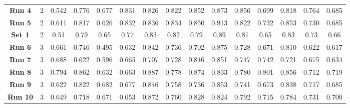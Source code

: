 \begin{table*}[!ht]
{\begin{tabular}{|c|c|ccc|ccc|ccc|c|c|c|c|}
			\textbf{Run 4} & 2 & \multicolumn{1}{c|}{0.542} & \multicolumn{1}{c|}{0.776} & 0.677 & \multicolumn{1}{c|}{0.831} & \multicolumn{1}{c|}{0.826} & 0.822 & \multicolumn{1}{c|}{0.852} & \multicolumn{1}{c|}{0.873} & 0.856 & 0.699 & 0.818 & 0.764 & 0.685 \\
			
			\textbf{Run 5} & 2 & \multicolumn{1}{c|}{0.611} & \multicolumn{1}{c|}{0.817} & 0.626 & \multicolumn{1}{c|}{0.832} & \multicolumn{1}{c|}{0.836} & 0.834 & \multicolumn{1}{c|}{0.850} & \multicolumn{1}{c|}{0.913} & 0.822 & 0.732 & 0.853 & 0.730 & 0.685 \\
			
			\hline
			
			\textbf{Set 1} & 2 & \multicolumn{1}{c|}{0.51} & \multicolumn{1}{c|}{0.79} & 0.65 & \multicolumn{1}{c|}{0.77} & \multicolumn{1}{c|}{0.83} & 0.82 & \multicolumn{1}{c|}{0.79} & \multicolumn{1}{c|}{0.89} & 0.81 & 0.65 & 0.83 & 0.73 & 0.66 \\
			
			\hline
			\hline
			
			\textbf{Run 6} & 3 & \multicolumn{1}{c|}{0.661} & \multicolumn{1}{c|}{0.746} & 0.495 & \multicolumn{1}{c|}{0.632} & \multicolumn{1}{c|}{0.842} & 0.736 & \multicolumn{1}{c|}{0.702} & \multicolumn{1}{c|}{0.875} & 0.728 & 0.671 & 0.810 & 0.622 & 0.617 \\
			
			\textbf{Run 7} & 3 & \multicolumn{1}{c|}{0.688} & \multicolumn{1}{c|}{0.622} & 0.596 & \multicolumn{1}{c|}{0.665} & \multicolumn{1}{c|}{0.707} & 0.728 & \multicolumn{1}{c|}{0.846} & \multicolumn{1}{c|}{0.851} & 0.747 & 0.742 & 0.721 & 0.675 & 0.634 \\
			
			\textbf{Run 8} & 3 & \multicolumn{1}{c|}{0.794} & \multicolumn{1}{c|}{0.862} & 0.632 & \multicolumn{1}{c|}{0.663} & \multicolumn{1}{c|}{0.887} & 0.778 & \multicolumn{1}{c|}{0.874} & \multicolumn{1}{c|}{0.833} & 0.780 & 0.801 & 0.856 & 0.712 & 0.719 \\
			
			\textbf{Run 9} & 3 & \multicolumn{1}{c|}{0.622} & \multicolumn{1}{c|}{0.822} & 0.682 & \multicolumn{1}{c|}{0.677} & \multicolumn{1}{c|}{0.846} & 0.758 & \multicolumn{1}{c|}{0.736} & \multicolumn{1}{c|}{0.853} & 0.741 & 0.673 & 0.838 & 0.717 & 0.685 \\
			
			\textbf{Run 10} & 3 & \multicolumn{1}{c|}{0.649} & \multicolumn{1}{c|}{0.718} & 0.671 & \multicolumn{1}{c|}{0.653} & \multicolumn{1}{c|}{0.872} & 0.760 & \multicolumn{1}{c|}{0.828} & \multicolumn{1}{c|}{0.824} & 0.792 & 0.715 & 0.784 & 0.731 & 0.700 \\
			

\end{tabular}}
\end{table*}
